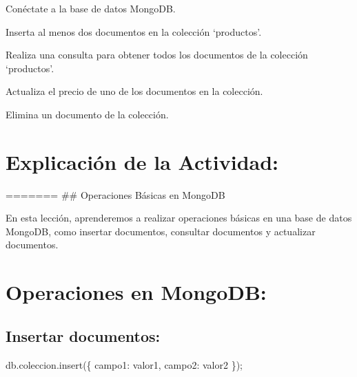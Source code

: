 \documentclass[
  a4paper,
  DIV=11,
  numbers=noendperiod,
  onepage,
  openany]{scrreprt}
\newenvironment{Shaded}{\begin{snugshade}}{\end{snugshade}}
\newcommand{\NormalTok}[1]{\textcolor[rgb]{0.00,0.23,0.31}{#1}}
\begin{document}
\begin{tcolorbox}[enhanced jigsaw, colbacktitle=quarto-callout-important-color!10!white, toprule=.15mm, leftrule=.75mm, titlerule=0mm, opacityback=0, rightrule=.15mm, opacitybacktitle=0.6, breakable, left=2mm, coltitle=black, title=\textcolor{quarto-callout-important-color}{\faExclamation}\hspace{0.5em}{Actividad Práctica:}, toptitle=1mm, bottomtitle=1mm, arc=.35mm, bottomrule=.15mm, colback=white, colframe=quarto-callout-important-color-frame]

Conéctate a la base de datos MongoDB.

Inserta al menos dos documentos en la colección `productos'.

Realiza una consulta para obtener todos los documentos de la colección
`productos'.

Actualiza el precio de uno de los documentos en la colección.

Elimina un documento de la colección.

\end{tcolorbox}

\hypertarget{explicaciuxf3n-de-la-actividad-76}{%
\section{Explicación de la
Actividad:}\label{explicaciuxf3n-de-la-actividad-76}}

======= \#\# Operaciones Básicas en MongoDB

En esta lección, aprenderemos a realizar operaciones básicas en una base
de datos MongoDB, como insertar documentos, consultar documentos y
actualizar documentos.

\hypertarget{operaciones-en-mongodb-1}{%
\section{Operaciones en MongoDB:}\label{operaciones-en-mongodb-1}}

\hypertarget{insertar-documentos-1}{%
\subsection{Insertar documentos:}\label{insertar-documentos-1}}

\begin{Shaded}
\begin{Highlighting}[]
\NormalTok{db.coleccion.insert(\{ campo1: valor1, campo2: valor2 \});}
\end{Highlighting}
\end{Shaded}
\end{document}

